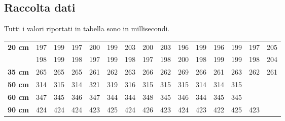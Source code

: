 \documentclass[a4paper,10pt]{report}
\begin{document}
\subsection{Raccolta dati}
Tutti i valori riportati in tabella sono in millisecondi.
\begin{center}
\begin{tabular}{r|*{14}{c}}
\textbf{20 cm} & 197 & 199 & 197 & 200 & 199 & 203 & 200 & 203 & 196 & 199 & 196 & 199 & 197 & 205\\
& 198 & 199 & 198 & 197 & 199 & 198 & 197 & 198 & 200 & 198 & 199 & 199 & 198 & 204\\
\midrule
\textbf{35 cm} & 265 & 265 & 265 & 261 & 262 & 263 & 266 & 262 & 269 & 266 & 261 & 263 & 262 & 261\\
\midrule
\textbf{50 cm} & 314 & 315 & 314 & 321 & 319 & 316 & 315 & 315 & 315 & 314 & 314 & 315\\
\midrule
\textbf{60 cm} & 347 & 345 & 346 & 347 & 344 & 344 & 348 & 345 & 346 & 344 & 345 & 345\\
\midrule
\textbf{90 cm} & 424& 424& 424& 423& 425& 424& 426& 423& 424& 423& 422& 425& 423\\
\end{tabular}
\end{center}
\end{document}
